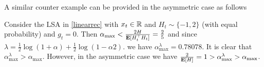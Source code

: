A similar counter example can be provided in the asymmetric case as follows
\begin{example}
Consider the LSA in \eqref{linearrec} with $x_t\in \mathbb{R}$ and $H_t\sim \{-1, 2\}$ (with equal probability)  and $g_t=0$. Then 
$
\alpha_{\max}<\frac{2H}{\mathbf{E}[H_t^\top H_t]}=\frac{2}{5}
$
and since 
$
\lambda=\frac{1}{2}\log(1+\alpha)+\frac{1}{2}\log(1-\alpha 2).
$
we have $\alpha^{\lambda}_{\max}=0.78078$. It is clear that $\alpha^{\lambda}_{\max}>\alpha_{\max}$. However, in the asymmetric case we have $\frac{2}{\mathbf{E}[H]}=1>\alpha^{\lambda}_{\max}>\alpha_{\max}$.
\end{example}


